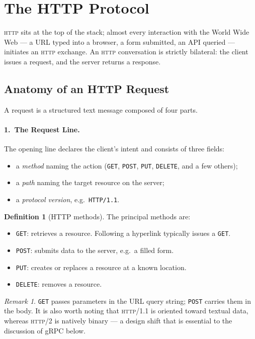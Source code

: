 \documentclass[11pt,a4paper]{article}
\theoremstyle{definition}
\newtheorem{definition}{Definition}[section]
\theoremstyle{remark}
\newtheorem*{remark}{Remark}
\begin{document}
\section{The HTTP Protocol}


\textsc{http} sits at the top of the stack; almost every interaction with the World Wide Web --- a URL typed into a browser, a form submitted, an API queried --- initiates an \textsc{http} exchange. An \textsc{http} conversation is strictly bilateral: the client issues a request, and the server returns a response.

\subsection{Anatomy of an HTTP Request}

A request is a structured text message composed of four parts.

\paragraph{1.\ The Request Line.}
The opening line declares the client's intent and consists of three fields:
\begin{itemize}
    \item a \emph{method} naming the action (\texttt{GET}, \texttt{POST}, \texttt{PUT}, \texttt{DELETE}, and a few others);
    \item a \emph{path} naming the target resource on the server;
    \item a \emph{protocol version}, e.g.\ \texttt{HTTP/1.1}.
\end{itemize}

\begin{definition}[HTTP methods]
The principal methods are:
\begin{itemize}
    \item \texttt{GET}: retrieves a resource. Following a hyperlink typically issues a \texttt{GET}.
    \item \texttt{POST}: submits data to the server, e.g.\ a filled form.
    \item \texttt{PUT}: creates or replaces a resource at a known location.
    \item \texttt{DELETE}: removes a resource.
\end{itemize}
\end{definition}

\begin{remark}
\texttt{GET} passes parameters in the URL query string; \texttt{POST} carries them in the body. It is also worth noting that \textsc{http}/1.1 is oriented toward textual data, whereas \textsc{http}/2 is natively binary --- a design shift that is essential to the discussion of gRPC below.
\end{remark}
\end{document}
